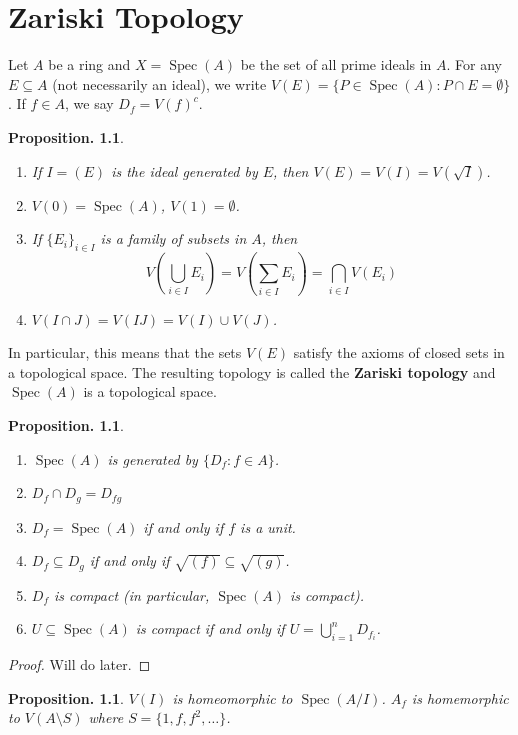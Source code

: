 \documentclass[11pt, a4paper]{memoir}
\theoremstyle{change}
\newtheorem{proposition}[theorem]{Proposition.}
\theoremstyle{plain}
\theoremstyle{nonumberplain}
\newtheorem{proof}{Proof}
\DeclareMathOperator{\Spec}{Spec}
\numberwithin{equation}{section}
\begin{document}
\chapter{Zariski Topology}
Let $A$ be a ring and $X=\Spec(A)$ be the set of all prime ideals in $A$.
For any $E\subseteq A$ (not necessarily an ideal), we write $V(E)=\{P\in \Spec(A):P\cap E=\emptyset\}$.
If $f\in A$, we say $D_f=V(f)^c$.
\begin{proposition}
    \begin{enumerate}[nl,r]
        \item If $I=(E)$ is the ideal generated by $E$, then $V(E)=V(I)=V(\sqrt{I})$.
        \item $V(0)=\Spec(A)$, $V(1)=\emptyset$.
        \item If $\{E_i\}_{i\in I}$ is a family of subsets in $A$, then
            \begin{equation*}
                V\left(\bigcup_{i\in I}E_i\right)=V\left(\sum_{i\in I}E_i\right)=\bigcap_{i\in I}V(E_i)
            \end{equation*}
        \item $V(I\cap J)=V(IJ)=V(I)\cup V(J)$.
    \end{enumerate}
\end{proposition}
In particular, this means that the sets $V(E)$ satisfy the axioms of closed sets in a topological space.
The resulting topology is called the \textbf{Zariski topology} and $\Spec(A)$ is a topological space.
\begin{proposition}
    \begin{enumerate}[nl,r]
        \item $\Spec(A)$ is generated by $\{D_f:f\in A\}$.
        \item $D_f\cap D_g=D_{fg}$
        \item $D_f=\Spec(A)$ if and only if $f$ is a unit.
        \item $D_f\subseteq D_g$ if and only if $\sqrt{(f)}\subseteq\sqrt{(g)}$.
        \item $D_f$ is compact (in particular, $\Spec(A)$ is compact).
        \item $U\subseteq\Spec(A)$ is compact if and only if $U=\bigcup_{i=1}^n D_{f_i}$.
    \end{enumerate}
\end{proposition}
\begin{proof}
    Will do later.
\end{proof}
\begin{proposition}
    $V(I)$ is homeomorphic to $\Spec(A/I)$.
    $A_f$ is homemorphic to $V(A\setminus S)$ where $S=\{1,f,f^2,\ldots\}$.
\end{proposition}
\end{document}
